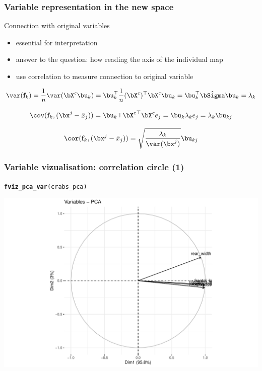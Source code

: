 \documentclass{beamer}\usepackage[]{graphicx}\usepackage[]{color}
\makeatletter
\newcommand{\hlstd}[1]{\textcolor[rgb]{0.345,0.345,0.345}{#1}}%
\newcommand{\hlkwd}[1]{\textcolor[rgb]{0.737,0.353,0.396}{\textbf{#1}}}%
\newenvironment{kframe}{%
 \def\at@end@of@kframe{}%
 \ifinner\ifhmode%
  \def\at@end@of@kframe{\end{minipage}}%
  \begin{minipage}{\columnwidth}%
 \fi\fi%
 \def\FrameCommand##1{\hskip\@totalleftmargin \hskip-\fboxsep
 \colorbox{shadecolor}{##1}\hskip-\fboxsep
     \hskip-\linewidth \hskip-\@totalleftmargin \hskip\columnwidth}%
 \MakeFramed {\advance\hsize-\width
   \@totalleftmargin\z@ \linewidth\hsize
   \@setminipage}}%
 {\par\unskip\endMakeFramed%
 \at@end@of@kframe}
\newenvironment{knitrout}{}{} %
\makeatother
\begin{document}
\begin{frame}
  \frametitle{Variable representation in the new space}
  
  \begin{block}{Connection with original variables}
    \begin{itemize}
      \item essential for interpretation
      \item answer to the question: how reading the axis of the individual map
      \item use correlation to measure connection to original variable
    \end{itemize}
  \end{block}

  \begin{equation*}
    \var(\mathbf{f}_k) = \frac{1}{n}\var(\bX^c \bu_k) = \bu_k^\top \frac{1}{n}(\bX^c)^\top \bX^c \bu_k =  \bu_k^\top \hat{\bSigma} \bu_k = \lambda_k
  \end{equation*}
  
  \begin{equation*}
    \cov(\mathbf{f}_k, (\bx^j - \bar{x}_j)) = \bu_k \top {\bX^c}^\top \bX^c e_j = \bu_k \lambda_k e_j = \lambda_k \bu_{kj}   
  \end{equation*}

  \begin{equation*}
    \cor(\mathbf{f}_k, (\bx^j - \bar{x}_j)) =  \sqrt{\frac{\lambda_k}{\var(\bx^j)}}\bu_{kj}
  \end{equation*}
  
\end{frame}

\begin{frame}[fragile]
  \frametitle{Variable vizualisation: correlation circle (1)}

\begin{knitrout}\scriptsize
{}\color{fgcolor}\begin{kframe}
\begin{alltt}
\hlkwd{fviz_pca_var}\hlstd{(crabs_pca)}
\end{alltt}
\end{kframe}
\includegraphics[width=.8\textwidth]{figures/pca_crabs_varmap1-1} 

\end{knitrout}

\end{frame}
\end{document}
